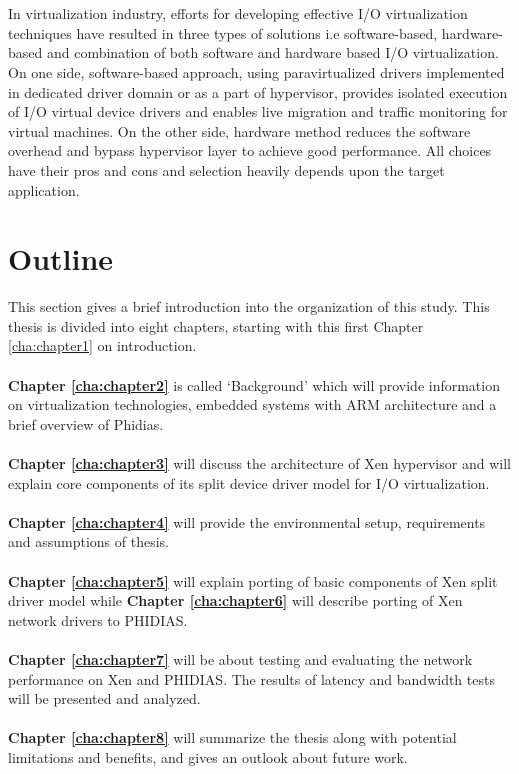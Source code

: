 \\
\\
In virtualization industry, efforts for developing effective I/O virtualization techniques have resulted in three types of solutions i.e software-based, hardware-based and combination of both software and hardware based I/O virtualization. On one side, software-based approach, using paravirtualized drivers implemented in dedicated driver domain or as a part of hypervisor, provides isolated execution of I/O virtual device drivers and enables live migration \cite{migration} and traffic monitoring \cite{monitoring} for virtual machines. On the other side, hardware method reduces the software overhead and bypass hypervisor layer to achieve good performance. All choices have their pros and cons and selection heavily depends upon the target application.

\section{Outline\label{sec:outline}}

This section gives a brief introduction into the organization of this study. This thesis is divided into eight chapters, starting with this first Chapter \ref{cha:chapter1} on introduction. 
\\
\\
\textbf{Chapter \ref{cha:chapter2}} is called `Background' which will provide information on virtualization technologies, embedded systems with ARM architecture and a brief overview of Phidias.
\\
\\
\textbf{Chapter \ref{cha:chapter3}} will discuss the architecture of Xen hypervisor and will explain core components of its split device driver model for I/O virtualization.
\\
\\
\textbf{Chapter \ref{cha:chapter4}} will provide the environmental setup, requirements and assumptions of thesis.
\\
\\
\textbf{Chapter \ref{cha:chapter5}} will explain porting of basic components of Xen split driver model while  \textbf{Chapter \ref{cha:chapter6}} will describe porting of Xen network drivers to PHIDIAS.
\\
\\
\textbf{Chapter \ref{cha:chapter7}} will be about testing and evaluating the network performance on Xen and PHIDIAS. The results of latency and bandwidth tests will be presented and analyzed.
\\
\\
\textbf{Chapter \ref{cha:chapter8}} will summarize the thesis along with potential limitations and benefits, and gives an outlook about future work.
